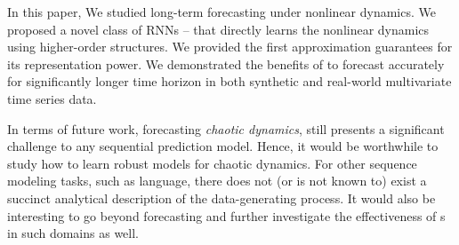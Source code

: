In this paper, We studied long-term forecasting  under nonlinear dynamics. We proposed a novel class of RNNs -- \trnn{} that directly learns the nonlinear dynamics using higher-order structures. We  provided the first  approximation guarantees for its representation power. We demonstrated the benefits of \trnn{} to forecast accurately for significantly longer time horizon in both synthetic and real-world multivariate time series data.

In terms of future work, forecasting \emph{chaotic dynamics}, still presents a significant challenge to any sequential prediction model. Hence, it would be worthwhile to study how to learn robust models for chaotic dynamics. For other sequence modeling tasks, such as language, there does not (or is not known to) exist a succinct analytical description of the data-generating process. It would also be interesting to go beyond forecasting and further investigate the effectiveness of \trnn{}s in such domains as well.
